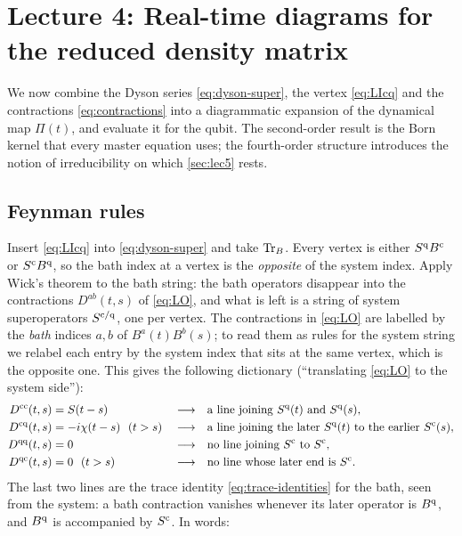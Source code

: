 \section{Lecture 4: Real-time diagrams for the reduced density matrix}
\label{sec:lec4}

We now combine the Dyson series \eqref{eq:dyson-super}, the vertex \eqref{eq:LIcq} and the contractions \eqref{eq:contractions} into a diagrammatic expansion of the dynamical map $\Pi(t)$, and evaluate it for the qubit.
The second-order result is the Born kernel that every master equation uses; the fourth-order structure introduces the notion of irreducibility on which \cref{sec:lec5} rests.

\subsection{Feynman rules}
\label{sec:feynman-rules}

Insert \cref{eq:LIcq} into \cref{eq:dyson-super} and take $\operatorname{Tr}_B$.
Every vertex is either $S^{\mathrm{q}} B^{\mathrm{c}}$ or $S^{\mathrm{c}} B^{\mathrm{q}}$, so the bath index at a vertex is the \emph{opposite} of the system index.
Apply Wick's theorem to the bath string: the bath operators disappear into the contractions $D^{ab}(t,s)$ of \cref{eq:LO}, and what is left is a string of system superoperators $S^{\mathrm{c}/\mathrm{q}}$, one per vertex.
The contractions in \cref{eq:LO} are labelled by the \emph{bath} indices $a,b$ of $B^a(t)B^b(s)$; to read them as rules for the system string we relabel each entry by the system index that sits at the same vertex, which is the opposite one.
This gives the following dictionary (``translating \cref{eq:LO} to the system side''):
\begin{equation}
\begin{aligned}
  D^{\mathrm{c}\mathrm{c}}(t,s)&=S(t-s) &&\longrightarrow&& \text{a line joining } S^{\mathrm{q}}(t)\text{ and }S^{\mathrm{q}}(s),\\
  D^{\mathrm{c}\mathrm{q}}(t,s)&=-i\chi(t-s)\ \ (t>s) &&\longrightarrow&& \text{a line joining the later } S^{\mathrm{q}}(t)\text{ to the earlier }S^{\mathrm{c}}(s),\\
  D^{\mathrm{q}\mathrm{q}}(t,s)&=0 &&\longrightarrow&& \text{no line joining } S^{\mathrm{c}}\text{ to }S^{\mathrm{c}},\\
  D^{\mathrm{q}\mathrm{c}}(t,s)&=0\ \ (t>s) &&\longrightarrow&& \text{no line whose later end is }S^{\mathrm{c}} .
\end{aligned}
\label{eq:system-dictionary}
\end{equation}
The last two lines are the trace identity \eqref{eq:trace-identities} for the bath, seen from the system: a bath contraction vanishes whenever its later operator is $B^{\mathrm{q}}$, and $B^{\mathrm{q}}$ is accompanied by $S^{\mathrm{c}}$.
In words:

